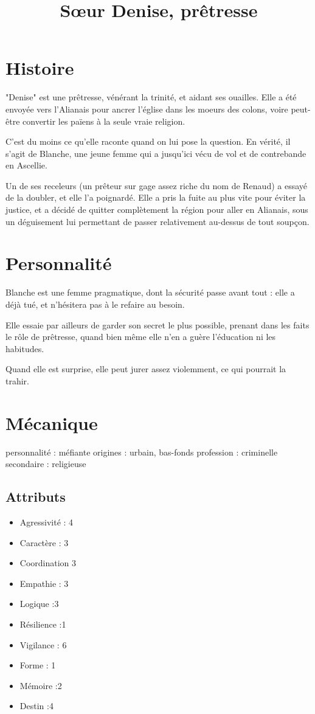 \documentclass[10pt,a4paper]{article}
\title{Sœur Denise, prêtresse}
\date{}
\begin{document}
\maketitle
\section{Histoire}
"Denise" est une prêtresse, vénérant la trinité, et aidant ses ouailles. Elle a été envoyée vers l'Alianais pour ancrer l'église dans les moeurs des colons, voire peut-être convertir les païens à la seule vraie religion.

C'est du moins ce qu'elle raconte quand on lui pose la question. En vérité, il s'agit de Blanche, une jeune femme qui a jusqu'ici vécu de vol et de contrebande en Ascellie. 

Un de ses receleurs (un prêteur sur gage assez riche du nom de Renaud) a essayé de la doubler, et elle l'a poignardé. Elle a pris la fuite au plus vite pour éviter la justice, et a décidé de quitter complètement la région pour aller en Alianais, sous un déguisement lui permettant de passer relativement au-dessus de tout soupçon.
\section{Personnalité}
Blanche est une femme pragmatique, dont la sécurité passe avant tout : elle a déjà tué, et n'hésitera pas à le refaire au besoin. 

Elle essaie par ailleurs de garder son secret le plus possible, prenant dans les faits le rôle de prêtresse, quand bien même elle n'en a guère l'éducation ni les habitudes.

Quand elle est surprise, elle peut jurer assez violemment, ce qui pourrait la trahir.
\section{Mécanique}
personnalité : méfiante
origines : urbain, bas-fonds
profession : criminelle
secondaire : religieuse
\subsection{Attributs}
\begin{itemize}
\item Agressivité : 4
\item Caractère : 3
\item Coordination 3
\item Empathie : 3
\item Logique :3
\item Résilience :1
\item Vigilance : 6
\item Forme : 1
\item Mémoire :2
\item Destin :4
\end{itemize}
\end{document}
